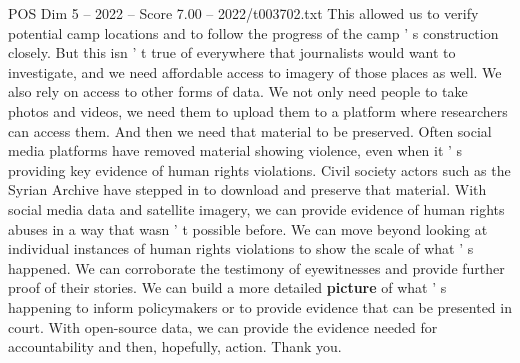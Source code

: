 \begin{textsample}{POS Dim 5 – 2022 – Score 7.00 – 2022/t003702.txt}
This allowed us to verify potential camp locations and to follow the progress of the camp ' s construction closely.
But this isn ' t true of everywhere that journalists would want to investigate, and we need affordable access to imagery of those places as well.
We also rely on access to other forms of data.
We not only need people to take photos and videos, we need them to upload them to a platform where researchers can access them.
And then we need that material to be preserved.
Often social media platforms have removed material showing violence, even when it ' s providing key evidence of human rights violations.
Civil society actors such as the Syrian Archive have stepped in to download and preserve that material.
With social media data and satellite imagery, we can provide evidence of human rights abuses in a way that wasn ' t possible before.
We can move beyond looking at individual instances of human rights violations to show the scale of what ' s happened.
We can corroborate the testimony of eyewitnesses and provide further proof of their stories.
We can build a more detailed \textbf{picture} of what ' s happening to inform policymakers or to provide evidence that can be presented in court.
With open-source data, we can provide the evidence needed for accountability and then, hopefully, action.
Thank you.

\end{textsample}
